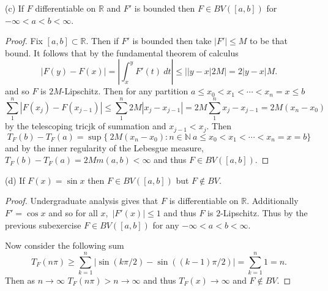 \documentclass[11pt]{amsart}
\theoremstyle{definition}
\numberwithin{theorem}{section}
\numberwithin{definition}{section}
\numberwithin{equation}{section}
\begin{document}
(c) If $F$ differentiable on $\mathbb{R}$ and $F'$ is bounded then $F \in BV([a,b])$ for $-\infty < a < b < \infty$. 
\begin{proof}
	Fix $[a,b] \subset \mathbb{R}$. Then if $F'$ is bounded then take $|F'| \leq M$ to be that bound. It follows that by the
	fundamental theorem of calculus \begin{equation*}
		|F(y) - F(x)| = \left|\int_{x}^y F'(t)\ dt\right| \leq ||y-x|2M| = 2|y-x|M.
	\end{equation*}
	and so $F$ is $2M$-Lipschitz. Then 
	for any partition $a\leq x_0 < x_1 < \cdots < x_n = x \leq b$
	\begin{equation*}
		\sum_{1}^n |F(x_j) - F(x_{j-1})| \leq \sum_{1}^n 2M|x_j - x_{j-1}| = 2M \sum_{1}^n x_j - x_{j-1} = 2M(x_n - x_0)
	\end{equation*}
	by the telescoping tricjk of summation and $x_{j-1} < x_j$. Then 
	$$T_F(b) - T_F(a) = \sup\{\ 2M(x_n - x_0) : n\in\mathbb{N}\  a\leq x_0 < x_1 < \cdots < x_n = x = b\}$$
	and by the inner regularity of the Lebesgue measure, $T_F(b) - T_F(a) = 2M m(a,b) < \infty$ and thus $F \in BV([a,b]).$
\end{proof}
(d) If $F(x) = \sin x$ then $F \in BV([a,b])$ but $F \not\in BV$. 
\begin{proof}
	Undergraduate analysis gives that $F$ is differentiable on $\mathbb{R}$. Additionally $F' = \cos x $ and so for all $x,$ $|F'(x)| \leq 1$
	and thus $F$ is $2$-Lipschitz.  Thus by the previous subexercise $F \in BV([a,b])$ for any  $-\infty < a < b < \infty$. 

	Now consider the following sum
	\begin{equation*}
		T_F(n\pi) \geq \sum_{k=1}^n |\sin(k\pi/2) - \sin((k-1)\pi/2)| = \sum_{k=1}^n 1 = n.
	\end{equation*}
	Then as $n \to \infty$ $T_F(n \pi) > n \to \infty$ and thus $T_F(x) \to \infty$ and $F \notin BV.$
\end{proof}
\end{document}
